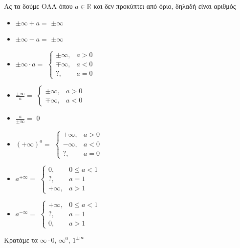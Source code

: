 \documentclass[greek]{beamer}
\begin{document}
\begin{frame}{Ας τα δούμε ΟΛΑ}
 όπου $a\in\mathbb{R}$ και δεν προκύπτει από όριο, δηλαδή είναι αριθμός
 \begin{multicols}{2}
  \begin{itemize}
   \item $\pm\infty + a=$ \pause $\pm\infty$ \pause
   \item $\pm\infty - a=$ \pause $\pm\infty$ \pause
   \item $\pm\infty \cdot a=$ \pause $\begin{cases} \pm\infty, & a>0 \\ \mp\infty, & a<0 \\ ?, & a=0\end{cases}$ \pause
   \item $\frac{\pm\infty}{a}=$ \pause $\begin{cases} \pm\infty, & a>0 \\ \mp\infty, & a<0\end{cases}$ \pause
   \item $\frac{a}{\pm\infty}=$ \pause $0$ \pause
   \item $(+\infty)^a=$ \pause $\begin{cases} +\infty, & a>0 \\ -\infty, & a<0 \\ ?, & a=0\end{cases}$ \pause
   \item $a^{+\infty}=$ \pause $\begin{cases} 0, & 0\le a <1 \\ ?, & a=1 \\ +\infty, & a>1\end{cases}$ \pause
   \item $a^{-\infty}=$ \pause $\begin{cases} +\infty, & 0\le a <1 \\ ?, & a=1 \\ 0, & a>1\end{cases}$ \pause
  \end{itemize}
 \end{multicols}
 Κρατάμε τα $\infty\cdot 0$, $\infty^0$, $1^{\pm\infty}$
\end{frame}
\end{document}
